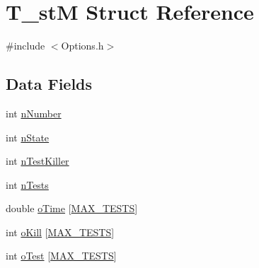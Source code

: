 \hypertarget{structT__stM}{\section{T\-\_\-st\-M Struct Reference}
\label{structT__stM}
}


{\ttfamily \#include $<$Options.\-h$>$}

\subsection*{Data Fields}
\begin{DoxyCompactItemize}
\item 
int \hyperlink{structT__stM_a3e49f3f7f8adb93d6eb5121f84c33816}{n\-Number}
\item 
int \hyperlink{structT__stM_a5dd1d5b522750b22895aa1146c06c3a6}{n\-State}
\item 
int \hyperlink{structT__stM_afb940fe5fd0991972e5ee8822805d10e}{n\-Test\-Killer}
\item 
int \hyperlink{structT__stM_a145001a7ab272ff272400d654985aaed}{n\-Tests}
\item 
double \hyperlink{structT__stM_a3b6e012242e88dd2c27e90bea06c3ef5}{o\-Time} \mbox{[}\hyperlink{Options_8h_a2a77d2f2c5b698c69c19e1f8782bf709}{M\-A\-X\-\_\-\-T\-E\-S\-T\-S}\mbox{]}
\item 
int \hyperlink{structT__stM_a607d25dfebe1f4c7fa623e1c11e596ac}{o\-Kill} \mbox{[}\hyperlink{Options_8h_a2a77d2f2c5b698c69c19e1f8782bf709}{M\-A\-X\-\_\-\-T\-E\-S\-T\-S}\mbox{]}
\item 
int \hyperlink{structT__stM_a96a05b3681ffbe7e0f1a8ee95b74fa3a}{o\-Test} \mbox{[}\hyperlink{Options_8h_a2a77d2f2c5b698c69c19e1f8782bf709}{M\-A\-X\-\_\-\-T\-E\-S\-T\-S}\mbox{]}
\end{DoxyCompactItemize}


